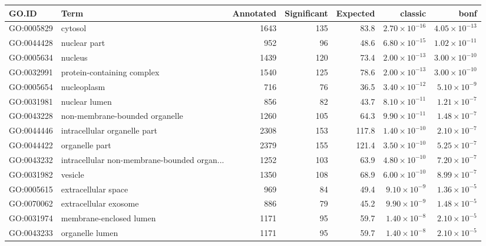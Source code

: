 \begin{table}[ht]
\centering
\begin{adjustbox}{max width=\textwidth}
\begin{tabular}{llrrrrr}
  \hline
GO.ID & Term & Annotated & Significant & Expected & classic & bonf \\ 
  \hline
GO:0005829 & cytosol & 1643 & 135 & 83.8 & $2.70 \times 10^{-16}$ & $4.05 \times 10^{-13}$ \\ 
  GO:0044428 & nuclear part & 952 & 96 & 48.6 & $6.80 \times 10^{-15}$ & $1.02 \times 10^{-11}$ \\ 
  GO:0005634 & nucleus & 1439 & 120 & 73.4 & $2.00 \times 10^{-13}$ & $3.00 \times 10^{-10}$ \\ 
  GO:0032991 & protein-containing complex & 1540 & 125 & 78.6 & $2.00 \times 10^{-13}$ & $3.00 \times 10^{-10}$ \\ 
  GO:0005654 & nucleoplasm & 716 & 76 & 36.5 & $3.40 \times 10^{-12}$ & $5.10 \times 10^{-9}$ \\ 
  GO:0031981 & nuclear lumen & 856 & 82 & 43.7 & $8.10 \times 10^{-11}$ & $1.21 \times 10^{-7}$ \\ 
  GO:0043228 & non-membrane-bounded organelle & 1260 & 105 & 64.3 & $9.90 \times 10^{-11}$ & $1.48 \times 10^{-7}$ \\ 
  GO:0044446 & intracellular organelle part & 2308 & 153 & 117.8 & $1.40 \times 10^{-10}$ & $2.10 \times 10^{-7}$ \\ 
  GO:0044422 & organelle part & 2379 & 155 & 121.4 & $3.50 \times 10^{-10}$ & $5.25 \times 10^{-7}$ \\ 
  GO:0043232 & intracellular non-membrane-bounded organ... & 1252 & 103 & 63.9 & $4.80 \times 10^{-10}$ & $7.20 \times 10^{-7}$ \\ 
  GO:0031982 & vesicle & 1350 & 108 & 68.9 & $6.00 \times 10^{-10}$ & $8.99 \times 10^{-7}$ \\ 
  GO:0005615 & extracellular space & 969 & 84 & 49.4 & $9.10 \times 10^{-9}$ & $1.36 \times 10^{-5}$ \\ 
  GO:0070062 & extracellular exosome & 886 & 79 & 45.2 & $9.90 \times 10^{-9}$ & $1.48 \times 10^{-5}$ \\ 
  GO:0031974 & membrane-enclosed lumen & 1171 & 95 & 59.7 & $1.40 \times 10^{-8}$ & $2.10 \times 10^{-5}$ \\ 
  GO:0043233 & organelle lumen & 1171 & 95 & 59.7 & $1.40 \times 10^{-8}$ & $2.10 \times 10^{-5}$ \\ 

\end{tabular}
\end{adjustbox}
\end{table}
